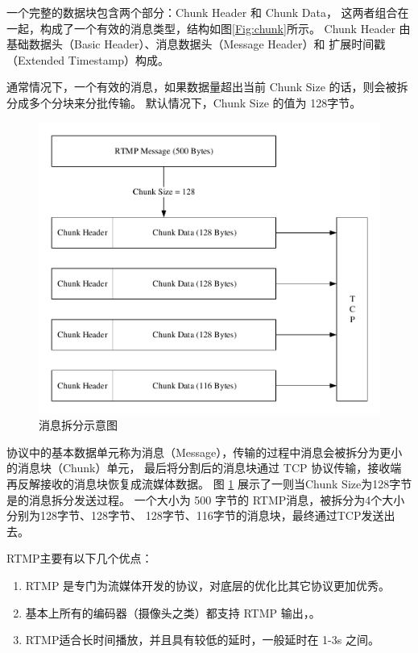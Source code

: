 一个完整的数据块包含两个部分：Chunk Header 和 Chunk Data，
这两者组合在一起，构成了一个有效的消息类型，结构如图\ref{Fig:chunk}所示。
Chunk Header 由基础数据头（Basic Header）、消息数据头（Message Header）和
扩展时间戳（Extended Timestamp）构成。

通常情况下，一个有效的消息，如果数据量超出当前 Chunk Size 的话，则会被拆分成多个分块来分批传输。
默认情况下，Chunk Size 的值为 128字节。

\begin{figure}[ht]
    \centering
    \includegraphics[scale=1]{./Figure/IMG_rtmp.pdf}
    \caption{消息拆分示意图}
    \label{Fig:rtmp}
\end{figure}
 
协议中的基本数据单元称为消息（Message），传输的过程中消息会被拆分为更小的消息块（Chunk）单元，
最后将分割后的消息块通过 TCP 协议传输，接收端再反解接收的消息块恢复成流媒体数据。
图 \ref{Fig:rtmp} 展示了一则当Chunk Size为128字节是的消息拆分发送过程。
一个大小为 500 字节的 RTMP消息，被拆分为4个大小分别为128字节、128字节、
128字节、116字节的消息块，最终通过TCP发送出去。


RTMP主要有以下几个优点：

\begin{enumerate}
    \item RTMP 是专门为流媒体开发的协议，对底层的优化比其它协议更加优秀。
    \item 基本上所有的编码器（摄像头之类）都支持 RTMP 输出，。
    \item RTMP适合长时间播放，并且具有较低的延时，一般延时在 1-3s 之间。
\end{enumerate}


